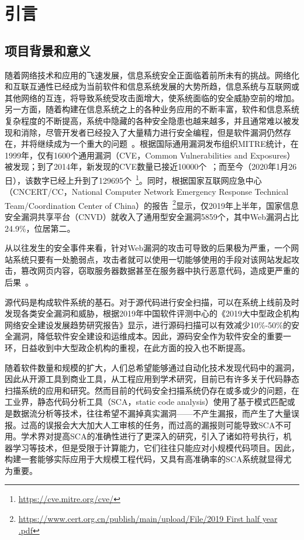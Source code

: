 \chapter{引言}

\section{项目背景和意义}
随着网络技术和应用的飞速发展，信息系统安全正面临着前所未有的挑战。网络化和互联互通性已经成为当前软件和信息系统发展的大势所趋，信息系统与互联网或其他网络的互连，将导致系统受攻击面增大，使系统面临的安全威胁空前的增加。另一方面，随着构建在信息系统之上的各种业务应用的不断丰富，软件和信息系统复杂程度的不断提高，系统中隐藏的各种安全隐患也越来越多，并且通常难以被发现和消除，尽管开发者已经投入了大量精力进行安全编程，但是软件漏洞仍然存在，并将继续成为一个重大的问题~\cite{vuldeepecker}。根据国际通用漏洞发布组织MITRE统计，在1999年，仅有1600个通用漏洞（CVE，Common Vulnerabilities and Exposures）被发现；到了2014年，新发现的CVE数量已接近10000个~\cite{liujian2018}；而至今（2020年1月26日），该数字已经上升到了129695个~\footnote{\url{https://cve.mitre.org/cve/}}。同时，根据国家互联网应急中心（CNCERT/CC，National Computer Network Emergency Response Technical Team/Coordination Center of China）的报告~\footnote{\url{https://www.cert.org.cn/publish/main/upload/File/2019 First half year .pdf}}显示，仅2019年上半年，国家信息安全漏洞共享平台（CNVD）就收入了通用型安全漏洞5859个，其中Web漏洞占比24.9\%，位居第二。

从以往发生的安全事件来看，针对Web漏洞的攻击可导致的后果极为严重，一个网站系统只要有一处脆弱点，攻击者就可以使用一切能够使用的手段对该网站发起攻击，篡改网页内容，窃取服务器数据甚至在服务器中执行恶意代码，造成更严重的后果~\cite{WebApplication}。

源代码是构成软件系统的基石。对于源代码进行安全扫描，可以在系统上线前及时发现各类安全漏洞和威胁，根据2019年中国软件评测中心的《2019大中型政企机构网络安全建设发展趋势研究报告》显示，进行源码扫描可以有效减少10\%-50\%的安全漏洞，降低软件安全建设和运维成本。因此，源码安全作为软件安全的重要一环，日益收到中大型政企机构的重视，在此方面的投入也不断提高。

随着软件数量和规模的扩大，人们总希望能够通过自动化技术发现代码中的漏洞，因此从开源工具到商业工具，从工程应用到学术研究，目前已有许多关于代码静态扫描系统的应用和研究。然而目前的代码安全扫描系统仍存在或多或少的问题，在工业界，静态代码分析工具（SCA，static code analysis）使用了基于模式匹配或是数据流分析等技术，往往希望不漏掉真实漏洞——不产生漏报，而产生了大量误报。过高的误报会大大加大人工审核的任务，而过高的漏报则可能导致SCA不可用。学术界对提高SCA的准确性进行了更深入的研究，引入了诸如符号执行，机器学习等技术，但是受限于计算能力，它们往往只能应对小规模代码项目。因此，构建一套能够实际应用于大规模工程代码，又具有高准确率的SCA系统就显得尤为重要。

